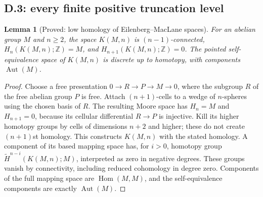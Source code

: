 \documentclass[11pt,a4paper]{article}
\newcommand{\Z}{\mathbb Z}
\newtheorem{lemma}[theorem]{Lemma}
\theoremstyle{definition}
\begin{document}
\subsection{D.3: every finite positive truncation level}
\begin{lemma}[Proved: low homology of Eilenberg--MacLane spaces]\label{D:EM-low}
For an abelian group $M$ and $n\geq2$, the space $K(M,n)$ is
$(n-1)$-connected, $H_n(K(M,n);\Z)=M$, and
$H_{n+1}(K(M,n);\Z)=0$. The pointed self-equivalence space of
$K(M,n)$ is discrete up to homotopy, with components
$\operatorname{Aut}(M)$.
\end{lemma}
\begin{proof}
Choose a free presentation $0\to R\to P\to M\to0$, where the
subgroup $R$ of the free abelian group $P$ is free. Attach
$(n+1)$-cells to a wedge of $n$-spheres using the chosen basis of
$R$. The resulting Moore space has $H_n=M$ and $H_{n+1}=0$,
because its cellular differential $R\to P$ is injective. Kill its
higher homotopy groups by cells of dimensions $n+2$ and higher;
these do not create $(n+1)$st homology. This constructs $K(M,n)$
with the stated homology. A component of its based mapping space
has, for $i>0$, homotopy group
$\widetilde H^{n-i}(K(M,n);M)$, interpreted as zero in negative
degrees. These groups vanish by connectivity, including reduced
cohomology in degree zero. Components of the full mapping space
are $\operatorname{Hom}(M,M)$, and the self-equivalence components
are exactly $\operatorname{Aut}(M)$.
\end{proof}
\end{document}
